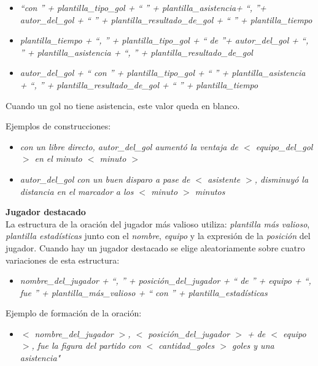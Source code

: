 
    \begin{itemize}
        \item \textit{ “con ” + plantilla\_tipo\_gol + “ ” + plantilla\_asistencia+ “, ”+ autor\_del\_gol + “ ” + plantilla\_resultado\_de\_gol + “ ” + plantilla\_tiempo}
        \item \textit{plantilla\_tiempo + “, ” + plantilla\_tipo\_gol + “ de ”+ autor\_del\_gol + “, ” + plantilla\_asistencia + “, ” + plantilla\_resultado\_de\_gol}
        \item \textit{autor\_del\_gol + “ con ” + plantilla\_tipo\_gol + “ ” + plantilla\_asistencia + “, ” + plantilla\_resultado\_de\_gol + “ ” + plantilla\_tiempo}
    \end{itemize}

    Cuando un gol no tiene asistencia, este valor queda en blanco.

    Ejemplos de construcciones:

    \begin{itemize}
        \item \textit{con un libre directo, autor\_del\_gol aumentó la ventaja de $<$ equipo\_del\_gol $>$ en el minuto $<$ minuto $>$}
        \item \textit{autor\_del\_gol con un buen disparo a pase de $<$ asistente $>$, disminuyó la distancia en el marcador a los $<$ minuto $>$ minutos} 
    \end{itemize}

\textbf{Jugador destacado}\\

    La estructura de la oración del jugador más valioso utiliza: \textit{plantilla más valioso}, \textit{plantilla estadísticas} junto con el \textit{nombre}, 
\textit{equipo} y la expresión de la  \textit{posición} del jugador.
    Cuando hay un jugador destacado se elige aleatoriamente sobre cuatro variaciones de esta estructura:
    
    \begin{itemize}
        \item \textit{nombre\_del\_jugador + “, ” + posición\_del\_jugador + “ de ” + equipo + “, fue ” + plantilla\_más\_valioso + “ con ” +  plantilla\_estadísticas}
    \end{itemize}

    Ejemplo de formación de la oración:

    \begin{itemize}
        \item \textit{$<$ nombre\_del\_jugador $>$, $<$ posición\_del\_jugador $>$ + de $<$ equipo $>$, fue la figura del partido con $<$ cantidad\_goles $>$ goles y una asistencia" }
    \end{itemize}

